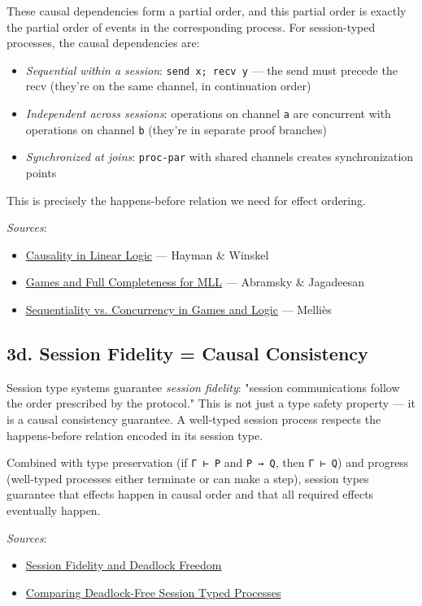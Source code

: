 \documentclass[11pt]{article}
\begin{document}
These causal dependencies form a partial order, and this partial order is
exactly the partial order of events in the corresponding process. For
session-typed processes, the causal dependencies are:

\begin{itemize}
\item \emph{Sequential within a session}: \texttt{send x; recv y} — the send must precede the
recv (they're on the same channel, in continuation order)
\item \emph{Independent across sessions}: operations on channel \texttt{a} are concurrent with
operations on channel \texttt{b} (they're in separate proof branches)
\item \emph{Synchronized at joins}: \texttt{proc-par} with shared channels creates
synchronization points
\end{itemize}

This is precisely the happens-before relation we need for effect ordering.

\emph{Sources}:
\begin{itemize}
\item \href{https://link.springer.com/chapter/10.1007/978-3-030-17127-8\_9}{Causality in Linear Logic} — Hayman \& Winskel
\item \href{https://arxiv.org/abs/1311.6057}{Games and Full Completeness for MLL} — Abramsky \& Jagadeesan
\item \href{https://arxiv.org/pdf/1111.7159}{Sequentiality vs. Concurrency in Games and Logic} — Melliès
\end{itemize}
\subsection{3d. Session Fidelity = Causal Consistency}
\label{sec:org9a31359}

Session type systems guarantee \emph{session fidelity}: "session communications
follow the order prescribed by the protocol." This is not just a type safety
property — it is a causal consistency guarantee. A well-typed session process
respects the happens-before relation encoded in its session type.

Combined with type preservation (if \texttt{Γ ⊢ P} and \texttt{P → Q}, then \texttt{Γ ⊢ Q}) and
progress (well-typed processes either terminate or can make a step), session
types guarantee that effects happen in causal order and that all required
effects eventually happen.

\emph{Sources}:
\begin{itemize}
\item \href{https://link.springer.com/chapter/10.1007/978-3-642-15375-4\_16}{Session Fidelity and Deadlock Freedom}
\item \href{https://eprints.gla.ac.uk/110759/1/110759.pdf}{Comparing Deadlock-Free Session Typed Processes}
\end{itemize}
\end{document}
